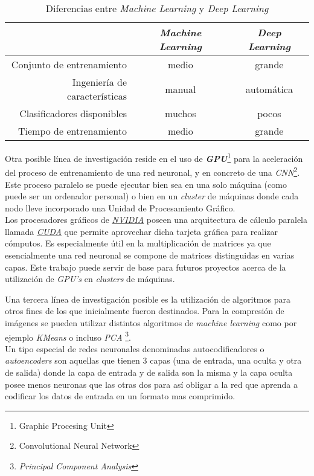 \begin{table}[!htpb]
  \centering
  \begin{tabular}{|r|c|c|} %
    \hline
    & \textbf{\textit{Machine Learning}} & \textbf{\textit{Deep Learning}} \\ \hline
    Conjunto de entrenamiento & medio & grande \\ \hline
    Ingeniería de características & manual & automática \\ \hline
    Clasificadores disponibles & muchos & pocos \\ \hline
    Tiempo de entrenamiento & medio & grande \\ \hline
  \end{tabular}
   \caption[Diferencias entre \textit{Machine Learning} y \textit{Deep Learning}]
           {Diferencias entre \textit{Machine Learning} y \textit{Deep Learning}}
   \label{MachineLearningVSDeepLearning}
\end{table}

Otra posible línea de investigación reside en el uso de \textbf{\textit{GPU}}\footnote{Graphic Procesing 
Unit} para la aceleración del proceso de entrenamiento de una red neuronal, y en concreto 
de una \textit{CNN}\footnote{Convolutional Neural Network}. 
Este proceso paralelo se puede ejecutar bien sea en una solo máquina (como puede ser un ordenador personal) 
o bien en un \textit{cluster} de máquinas donde cada nodo lleve incorporado una Unidad de Procesamiento Gráfico. \\
Los procesadores gráficos de \href{http://www.nvidia.es/page/home.html}{\textit{NVIDIA}} poseen una 
arquitectura de cálculo paralela llamada \href{http://www.nvidia.es/object/cuda-parallel-computing-es.html}{\textit{CUDA}} que permite aprovechar dicha tarjeta gráfica para realizar cómputos. Es especialmente útil en la multiplicación 
de matrices ya que esencialmente una red neuronal se compone de matrices distinguidas en varias capas.
Este trabajo puede servir de base para futuros proyectos acerca de la utilización de \textit{GPU's} en 
\textit{clusters} de máquinas.
\newline

Una tercera línea de investigación posible es la utilización de algoritmos para otros fines de los que
inicialmente fueron destinados. Para la compresión de imágenes se pueden utilizar distintos algoritmos de
\textit{machine learning} como por ejemplo \textit{KMeans} o incluso \textit{PCA}
\footnote{\textit{Principal Component Analysis}}.\\
Un tipo especial de redes neuronales denominadas autocodificadores o \textit{autoencoders} son aquellas que
tienen 3 capas (una de entrada, una oculta y otra de salida) donde la capa de entrada y de salida son la misma
y la capa oculta posee menos neuronas que las otras dos para así obligar a la red que aprenda a codificar los
datos de entrada en un formato mas comprimido.


\clearpage

